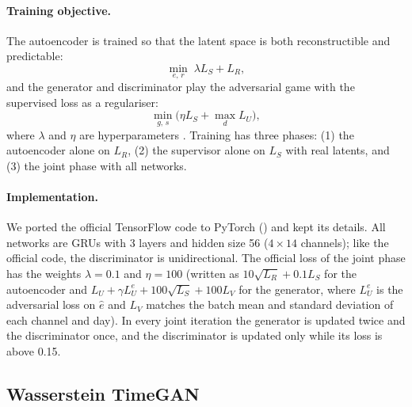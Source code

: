 \documentclass{article}
\begin{document}
\paragraph{Training objective.} The autoencoder is trained so that the latent space is both reconstructible and predictable:
\begin{equation}
\min_{e,\,r} \; \lambda L_S + L_R ,
\end{equation}
and the generator and discriminator play the adversarial game with the supervised loss as a regulariser:
\begin{equation}
\min_{g,\,s} \Big( \eta L_S + \max_{d} L_U \Big),
\end{equation}
where $\lambda$ and $\eta$ are hyperparameters \cite{yoon2019}. Training has three phases: (1) the autoencoder alone on $L_R$, (2) the supervisor alone on $L_S$ with real latents, and (3) the joint phase with all networks.

\paragraph{Implementation.} We ported the official TensorFlow code to PyTorch () and kept its details. All networks are GRUs with 3 layers and hidden size 56 ($4 \times 14$ channels); like the official code, the discriminator is unidirectional. The official loss of the joint phase has the weights $\lambda = 0.1$ and $\eta = 100$ (written as $10\sqrt{L_R} + 0.1 L_S$ for the autoencoder and $L_U + \gamma L_U^{e} + 100\sqrt{L_S} + 100 L_V$ for the generator, where $L_U^{e}$ is the adversarial loss on $\hat{e}$ and $L_V$ matches the batch mean and standard deviation of each channel and day). In every joint iteration the generator is updated twice and the discriminator once, and the discriminator is updated only while its loss is above 0.15.

\subsection{Wasserstein TimeGAN}
\label{sec:w5_wgan}
\end{document}
